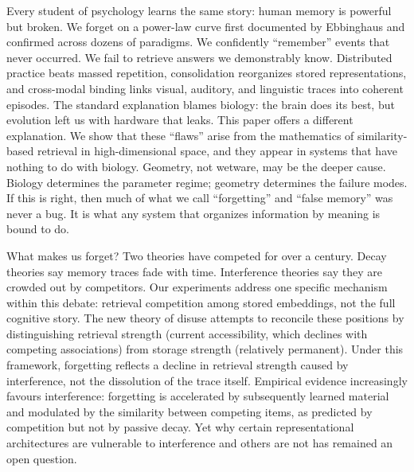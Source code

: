 \documentclass[11pt]{article}
\begin{document}
Every student of psychology learns the same story: human memory is powerful but broken. We forget on a power-law curve first documented by Ebbinghaus\cite{ebbinghaus1885} and confirmed across dozens of paradigms\cite{wixted1991}. We confidently ``remember'' events that never occurred\cite{roediger1995}. We fail to retrieve answers we demonstrably know\cite{brown1966}. Distributed practice beats massed repetition\cite{cepeda2006}, consolidation reorganizes stored representations\cite{nadel1997,mcclelland1995}, and cross-modal binding links visual, auditory, and linguistic traces into coherent episodes\cite{baddeley2000,tulving1972}. The standard explanation blames biology: the brain does its best, but evolution left us with hardware that leaks. This paper offers a different explanation. We show that these ``flaws'' arise from the mathematics of similarity-based retrieval in high-dimensional space, and they appear in systems that have nothing to do with biology. Geometry, not wetware, may be the deeper cause. Biology determines the parameter regime; geometry determines the failure modes. If this is right, then much of what we call ``forgetting'' and ``false memory'' was never a bug. It is what any system that organizes information by meaning is bound to do.

What makes us forget? Two theories have competed for over a century. Decay theories say memory traces fade with time. Interference theories say they are crowded out by competitors\cite{bjork1992,anderson1991}. Our experiments address one specific mechanism within this debate: retrieval competition among stored embeddings, not the full cognitive story. The new theory of disuse\cite{bjork1992} attempts to reconcile these positions by distinguishing retrieval strength (current accessibility, which declines with competing associations) from storage strength (relatively permanent). Under this framework, forgetting reflects a decline in retrieval strength caused by interference, not the dissolution of the trace itself. Empirical evidence increasingly favours interference: forgetting is accelerated by subsequently learned material\cite{mccloskey1989} and modulated by the similarity between competing items, as predicted by competition but not by passive decay. Yet why certain representational architectures are vulnerable to interference and others are not has remained an open question.
\end{document}
